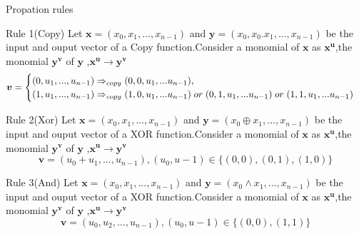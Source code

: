 \documentclass[notheorems, aspectratio=169]{beamer}
\def\bd#1{\boldsymbol{#1}}
\begin{document}
\begin{frame}{Propation rules}
    \begin{block}{Rule 1(Copy)}
        Let $\bd{x}=(x_0,x_1,...,x_{n-1})$ and $\bd{y}=(x_0,x_0.x_1,...,x_{n-1})$ be the input and ouput vector of 
    a Copy function.Consider a monomial of $\bd{x}$ as $\bd{x}^{\bd{u}}$,the monomial $\bd{y}^{\bd{v}}$ of $\bd{y}$ ,$\bd{x}^{\bd{u}} \rightarrow \bd{y}^{\bd{v}}$ 
        \begin{align}
            \bd{v}=
        \begin{cases}
            (0,u_1,...,u_{n-1}) \Rightarrow _{copy}(0,0,u_1,...u_{n-1}),\\
            (1,u_1,...,u_{n-1}) \Rightarrow _{copy}(1,0,u_1,...u_{n-1})\;or\;(0,1,u_1,...u_{n-1})\;or\;(1,1,u_1,...u_{n-1})
        \end{cases}\notag 
        \end{align}
\end{block}

    
\begin{block}{Rule 2(Xor)}
    Let $\bd{x}=(x_0,x_1,...,x_{n-1})$ and $\bd{y}=(x_0\oplus x_1,...,x_{n-1})$ be the input and ouput vector of 
    a XOR function.Consider a monomial of $\bd{x}$ as $\bd{x}^{\bd{u}}$,the monomial $\bd{y}^{\bd{v}}$ of $\bd{y}$ ,$\bd{x}^{\bd{u}} \rightarrow \bd{y}^{\bd{v}}$ 
    $$
        \bd{v}=(u_0+u_1,...,u_{n-1}),(u_0,u-1)\in \{(0,0),(0,1),(1,0)\}
    $$
\end{block}
\end{frame}
\begin{frame}
\begin{block}{Rule 3(And)}
    Let $\bd{x}=(x_0,x_1,...,x_{n-1})$ and $\bd{y}=(x_0\land x_1,...,x_{n-1})$ be the input and ouput vector of 
    a XOR function.Consider a monomial of $\bd{x}$ as $\bd{x}^{\bd{u}}$,the monomial $\bd{y}^{\bd{v}}$ of $\bd{y}$ ,$\bd{x}^{\bd{u}} \rightarrow \bd{y}^{\bd{v}}$ 
    $$
        \bd{v}=(u_0,u_2,...,u_{n-1}),(u_0,u-1)\in \{(0,0),(1,1)\}
    $$
\end{block}

\end{frame}
\end{document}
